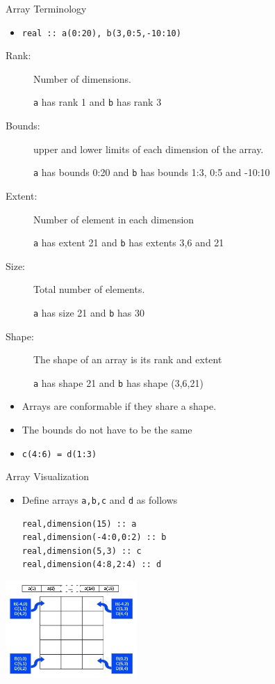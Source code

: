 \documentclass[c,mathserif,compress,xcolor=svgnames]{beamer}
\newcommand{\lstfortran}[1]{\lstinline[language={[90]Fortran},basicstyle=\footnotesize\ttfamily]|#1|}
\begin{document}
\begin{frame}{Array Terminology}
  \begin{itemize}
    \item[] \lstfortran{real :: a(0:20), b(3,0:5,-10:10)}
  \end{itemize}
  \begin{description}
    \item[Rank:] Number of dimensions.
    \item[] {\lstfortran{a}} has rank 1 and {\lstfortran{b}} has rank 3
    \item[Bounds:] upper and lower limits of each dimension of the array.
    \item[] {\lstfortran{a}} has bounds 0:20 and {\lstfortran{b}} has bounds 1:3, 0:5 and -10:10
    \item[Extent:] Number of element in each dimension
    \item[] {\lstfortran{a}} has extent 21 and {\lstfortran{b}} has extents 3,6 and 21
    \item[Size:] Total number of elements.
    \item[] {\lstfortran{a}} has size 21 and {\lstfortran{b}} has 30
    \item[Shape:] The shape of an array is its rank and extent
    \item[] \lstfortran{a} has shape 21 and \lstfortran{b} has shape (3,6,21)
  \end{description}
  \begin{itemize}
    \item Arrays are conformable if they share a shape.
    \item The bounds do not have to be the same
    \item[] \lstfortran{c(4:6) = d(1:3)}
  \end{itemize}
\end{frame}

\begin{frame}[fragile]{Array Visualization}
  \begin{itemize}
    \item Define arrays \lstfortran{a,b,c} and \lstfortran{d} as follows
      \begin{lstlisting}[language={[90]Fortran}]
real,dimension(15) :: a
real,dimension(-4:0,0:2) :: b
real,dimension(5,3) :: c
real,dimension(4:8,2:4) :: d
      \end{lstlisting}
  \end{itemize}
  \begin{center}
    \includegraphics[width=5cm,clip=true]{./array2-3-1}
  \end{center}
\end{frame}
\end{document}
